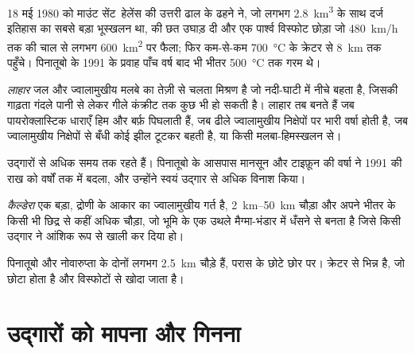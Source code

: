 18 मई 1980 को माउंट सेंट~हेलेंस की उत्तरी ढाल के ढहने ने, जो लगभग \qty{2.8}{km^3}
के साथ दर्ज इतिहास का सबसे बड़ा भूस्खलन था,  की छत उघाड़ दी और
एक पार्श्व विस्फोट छोड़ा जो
\qty{480}{km/h} तक की चाल से लगभग \qty{600}{km^2} पर फैला; फिर कम-से-कम \qty{700}{\celsius} के 
क्रेटर से \qty{8}{km} तक पहुँचे। पिनातूबो के 1991 के प्रवाह पाँच वर्ष बाद भी भीतर
\qty{500}{\celsius} तक गरम थे।

\begin{definition}[लाहार]\label{def:b2:eruptive-styles:lahar}
\emph{लाहार} जल और ज्वालामुखीय मलबे का तेज़ी से चलता मिश्रण है
जो नदी-घाटी में नीचे बहता है, जिसकी गाढ़ता गंदले पानी से लेकर
गीले कंक्रीट तक कुछ भी हो सकती है। लाहार तब बनते हैं जब पायरोक्लास्टिक धाराएँ हिम और बर्फ़ पिघलाती हैं, जब
ढीले ज्वालामुखीय निक्षेपों पर भारी वर्षा होती है, जब ज्वालामुखीय
निक्षेपों से बँधी कोई झील टूटकर बहती है, या किसी मलबा-हिमस्खलन से।
\end{definition}

 उद्गारों से अधिक समय तक रहते हैं। पिनातूबो के आसपास मानसून और टाइफ़ून की वर्षा ने
1991 की राख को वर्षों तक  में बदला, और उन्होंने स्वयं
उद्गार से अधिक विनाश किया।

\begin{definition}[कैल्डेरा]\label{def:b2:eruptive-styles:caldera}
\emph{कैल्डेरा} एक बड़ा, द्रोणी के आकार का ज्वालामुखीय गर्त है,
\qtyrange{2}{50}{km} चौड़ा और अपने भीतर के किसी भी छिद्र से कहीं अधिक चौड़ा, जो
भूमि के एक उथले मैग्मा-भंडार में धँसने से बनता है जिसे किसी उद्गार ने
आंशिक रूप से खाली कर दिया हो।
\end{definition}

पिनातूबो और नोवारुप्ता के  दोनों लगभग \qty{2.5}{km} चौड़े हैं, परास के
छोटे छोर पर।  क्रेटर से भिन्न है, जो छोटा होता है और विस्फोटों से खोदा जाता है।

\section{उद्गारों को मापना और गिनना}

